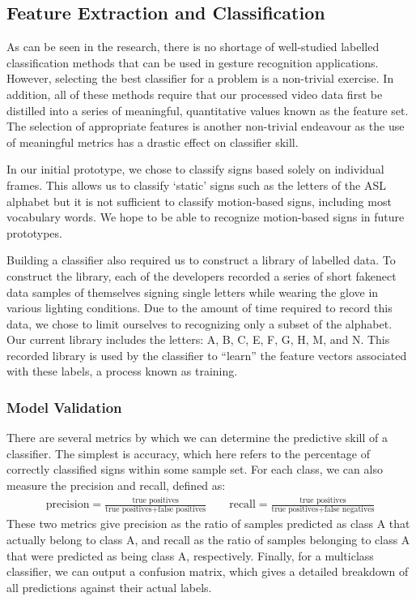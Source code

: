 \documentclass[12pt]{article}
\begin{document}
\subsection{Feature Extraction and Classification}
As can be seen in the research, there is no shortage of well-studied labelled classification methods that can be used in gesture recognition applications. However, selecting the best classifier for a problem is a non-trivial exercise. In addition, all of these methods require that our processed video data first be distilled into a series of meaningful, quantitative values known as the feature set. The selection of appropriate features is another non-trivial endeavour as the use of meaningful metrics has a drastic effect on classifier skill.

In our initial prototype, we chose to classify signs based solely on individual frames. This allows us to classify ‘static’ signs such as the letters of the ASL alphabet but it is not sufficient to classify motion-based signs, including most vocabulary words. We hope to be able to recognize motion-based signs in future prototypes. 

Building a classifier also required us to construct a library of labelled data. To construct the library, each of the developers recorded a series of short fakenect data samples of themselves signing single letters while wearing the glove in various lighting conditions. Due to the amount of time required to record this data, we chose to limit ourselves to recognizing only a subset of the alphabet. Our current library includes the letters: A, B, C, E, F, G, H, M, and N. This recorded library is used by the classifier to “learn” the feature vectors associated with these labels, a process known as training.  

\subsubsection{Model Validation}
There are several metrics by which we can determine the predictive skill of a classifier. The simplest is accuracy, which here refers to the percentage of correctly classified signs within some sample set. For each class, we can also measure the precision and recall, defined as:
\begin{gather*}
\text{precision} = \frac {\text{true positives}} {\text{true positives} + \text{false positives}} 
\quad \quad
\text{recall} = \frac {\text{true positives}} {\text{true positives} + \text{false negatives}}
\end{gather*}
These two metrics give precision as the ratio of samples predicted as class A that actually belong to class A, and recall as the ratio of samples belonging to class A that were predicted as being class A, respectively. Finally, for a multiclass classifier, we can output a confusion matrix, which gives a detailed breakdown of all predictions against their actual labels. 
\end{document}
